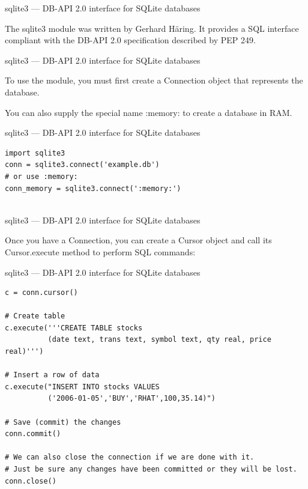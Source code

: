 \documentclass{beamer}
\begin{document}
\begin{frame}[t]{sqlite3 --- DB-API 2.0 interface for SQLite databases}

The sqlite3 module was written by Gerhard Häring.  It provides a SQL interface
compliant with the DB-API 2.0 specification described by PEP 249.

\end{frame}


\begin{frame}[t]{sqlite3 --- DB-API 2.0 interface for SQLite databases}

To use the module, you must first create a Connection object that
represents the database.  

You can also supply the special name :memory: to create a database in RAM.

\end{frame}


\begin{frame}[t,fragile]{sqlite3 --- DB-API 2.0 interface for SQLite databases}


\begin{verbatim}
import sqlite3
conn = sqlite3.connect('example.db')
# or use :memory:
conn_memory = sqlite3.connect(':memory:')


\end{verbatim}


\end{frame}


\begin{frame}[t]{sqlite3 --- DB-API 2.0 interface for SQLite databases}

Once you have a Connection, you can create a Cursor  object
and call its Cursor.execute method to perform SQL commands:

\end{frame}


\begin{frame}[t,fragile]{sqlite3 --- DB-API 2.0 interface for SQLite databases}

\scriptsize
\begin{verbatim}
c = conn.cursor()

# Create table
c.execute('''CREATE TABLE stocks
          (date text, trans text, symbol text, qty real, price real)''')

# Insert a row of data
c.execute("INSERT INTO stocks VALUES 
          ('2006-01-05','BUY','RHAT',100,35.14)")

# Save (commit) the changes
conn.commit()

# We can also close the connection if we are done with it.
# Just be sure any changes have been committed or they will be lost.
conn.close()


\end{verbatim}


\end{frame}
\end{document}
